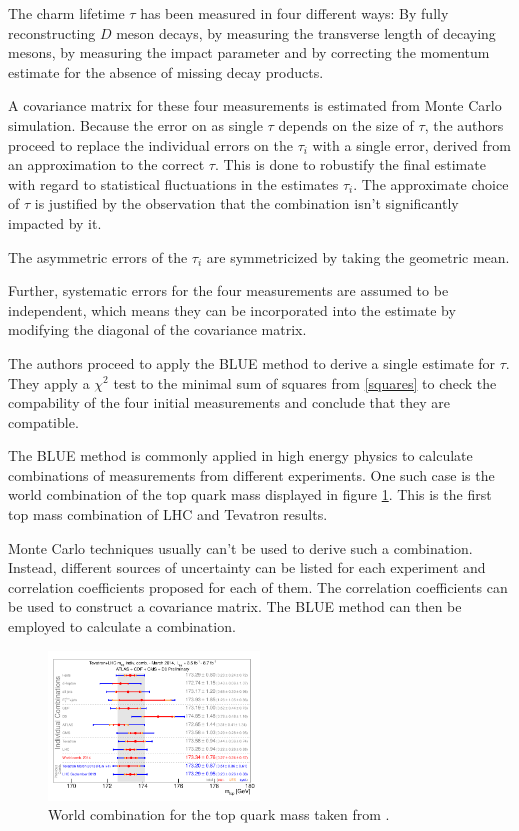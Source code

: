 The charm lifetime $τ$ has been measured in four different ways\cite{augilar}: By fully reconstructing $D$ meson decays, by measuring the transverse length of decaying mesons, by measuring the impact parameter and by correcting the momentum estimate for the absence of missing decay products.

A covariance matrix for these four measurements is estimated from Monte Carlo simulation.
Because the error on as single $τ$ depends on the size of $τ$, the authors proceed to replace the individual errors on the $τ_i$ with a single error, derived from an approximation to the correct $τ$.
This is done to robustify the final estimate with regard to statistical fluctuations in the estimates $τ_i$.
The approximate choice of $τ$ is justified by the observation that the combination isn't significantly impacted by it.

The asymmetric errors of the $τ_i$ are symmetricized by taking the geometric mean.

Further, systematic errors for the four measurements are assumed to be independent, which means they can be incorporated into the estimate by modifying the diagonal of the covariance matrix.

The authors proceed to apply the BLUE method to derive a single estimate for $τ$.
They apply a $χ^2$ test to the minimal sum of squares from \eqref{squares} to check the compability of the four initial measurements and conclude that they are compatible.

The BLUE method is commonly applied in high energy physics to calculate combinations of measurements from different experiments.
One such case is the world combination of the top quark mass displayed in figure \ref{world}.
This is the first top mass combination of LHC and Tevatron results.

Monte Carlo techniques usually can't be used to derive such a combination.
Instead, different sources of uncertainty can be listed for each experiment and correlation coefficients proposed for each of them.
The correlation coefficients can be used to construct a covariance matrix.
The BLUE method can then be employed to calculate a combination.

\begin{figure}
  \includegraphics[width=0.5\textwidth]{./figures/world.pdf}
  \caption{World combination for the top quark mass taken from \cite{atlas}.}
  \label{world}
\end{figure}

\vspace{1em}

\nocite{*}
\printbibliography


